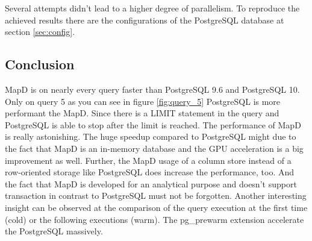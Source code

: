 Several attempts didn't lead to a higher degree of parallelism.
To reproduce the achieved results there are the configurations of the PostgreSQL database at section \ref{sec:config}.

\newpage
\subsection{Conclusion}
MapD is on nearly every query faster than PostgreSQL 9.6 and PostgreSQL 10.
Only on query 5 as you can see in figure \ref{fig:query_5} PostgreSQL is more performant the MapD.
Since there is a LIMIT statement in the query and PostgreSQL is able to stop after the limit is reached.
The performance of MapD is really astonishing.
The huge speedup compared to PostgreSQL might due to the fact that MapD is an in-memory database and the GPU acceleration is a big improvement as well.
Further, the MapD usage of a column store instead of a row-oriented storage like PostgreSQL does increase the performance, too.
And the fact that MapD is developed for an analytical purpose and doesn't support transaction in contrast to PostgreSQL must not be forgotten.
Another interesting insight can be observed at the comparison of the query execution at the first time (cold) or the following executions (warm).
The pg\_prewarm extension accelerate the PostgreSQL massively.
